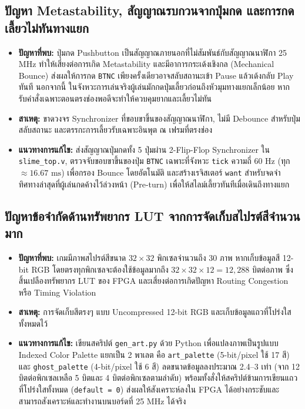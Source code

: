 \subsection{ปัญหา Metastability, สัญญาณรบกวนจากปุ่มกด และการกดเลี้ยวไม่ทันทางแยก}
\begin{itemize}[leftmargin=1.5cm]
    \item \textbf{ปัญหาที่พบ:} ปุ่มกด Pushbutton เป็นสัญญาณภายนอกที่ไม่สัมพันธ์กับสัญญาณนาฬิกา 25 MHz ทำให้เสี่ยงต่อการเกิด Metastability และมีอาการกระเด้งเชิงกล (Mechanical Bounce) ส่งผลให้การกด \texttt{BTNC} เพียงครั้งเดียวอาจสลับสถานะเข้า Pause แล้วเด้งกลับ Play ทันที นอกจากนี้ ในจังหวะการเล่นจริงผู้เล่นมักกดปุ่มเลี้ยวก่อนถึงหัวมุมทางแยกเล็กน้อย หากรับคำสั่งเฉพาะตอนตรงช่องพอดีจะทำให้ควบคุมยากและเลี้ยวไม่ทัน
    \item \textbf{สาเหตุ:} ขาดวงจร Synchronizer ที่ขอบขาขึ้นของสัญญาณนาฬิกา, ไม่มี Debounce สำหรับปุ่มสลับสถานะ และตรรกะการเลี้ยวรับเฉพาะอินพุต ณ เฟรมที่ตรงช่อง
    \item \textbf{แนวทางการแก้ไข:} ส่งสัญญาณปุ่มกดทั้ง 5 ปุ่มผ่าน 2-Flip-Flop Synchronizer ใน \texttt{slime\_top.v}, ตรวจจับขอบขาขึ้นของปุ่ม \texttt{BTNC} เฉพาะที่จังหวะ \texttt{tick} ความถี่ 60 Hz (ทุก $\approx 16.67\text{ ms}$) เพื่อกรอง Bounce โดยอัตโนมัติ และสร้างเรจิสเตอร์ \texttt{want} สำหรับจดจำทิศทางล่าสุดที่ผู้เล่นกดค้างไว้ล่วงหน้า (Pre-turn) เพื่อให้สไลม์เลี้ยวทันทีเมื่อเดินถึงทางแยก
\end{itemize}

\subsection{ปัญหาข้อจำกัดด้านทรัพยากร LUT จากการจัดเก็บสไปรต์สีจำนวนมาก}
\begin{itemize}[leftmargin=1.5cm]
    \item \textbf{ปัญหาที่พบ:} เกมมีภาพสไปรต์สีขนาด $32\times32$ พิกเซลจำนวนถึง 30 ภาพ หากเก็บข้อมูลสี 12-bit RGB โดยตรงทุกพิกเซลจะต้องใช้ข้อมูลมากถึง $32 \times 32 \times 12 = 12,288$ บิตต่อภาพ ซึ่งสิ้นเปลืองทรัพยากร LUT ของ FPGA และเสี่ยงต่อการเกิดปัญหา Routing Congestion หรือ Timing Violation
    \item \textbf{สาเหตุ:} การจัดเก็บสีตรงๆ แบบ Uncompressed 12-bit RGB และเก็บข้อมูลแถวที่โปร่งใสทั้งหมดไว้
    \item \textbf{แนวทางการแก้ไข:} เขียนสคริปต์ \texttt{gen\_art.py} ด้วย Python เพื่อแปลงภาพเป็นรูปแบบ Indexed Color Palette แยกเป็น 2 พาเลต คือ \texttt{art\_palette} (5-bit/pixel ใช้ 17 สี) และ \texttt{ghost\_palette} (4-bit/pixel ใช้ 6 สี) ลดขนาดข้อมูลลงประมาณ 2.4--3 เท่า (จาก 12 บิตต่อพิกเซลเหลือ 5 บิตและ 4 บิตต่อพิกเซลตามลำดับ) พร้อมทั้งสั่งให้สคริปต์ข้ามการเขียนแถวที่โปร่งใสทั้งหมด (\texttt{default = 0}) ส่งผลให้สังเคราะห์ลงใน FPGA ได้อย่างกระชับและสามารถสังเคราะห์และทำงานบนบอร์ดที่ 25 MHz ได้จริง
\end{itemize}

